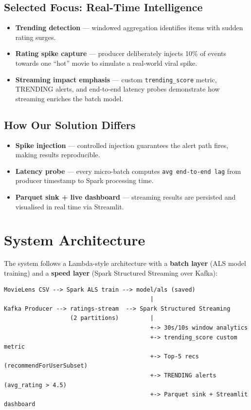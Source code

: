 \documentclass[12pt,a4paper]{article}
\begin{document}
\subsection{Selected Focus: Real-Time Intelligence}
\begin{itemize}
  \item \textbf{Trending detection} --- windowed aggregation identifies items with sudden rating surges.
  \item \textbf{Rating spike capture} --- producer deliberately injects 10\% of events towards one ``hot'' movie to simulate a real-world viral spike.
  \item \textbf{Streaming impact emphasis} --- custom \texttt{trending\_score} metric, TRENDING alerts, and end-to-end latency probes demonstrate how streaming enriches the batch model.
\end{itemize}

\subsection{How Our Solution Differs}
\begin{itemize}
  \item \textbf{Spike injection} --- controlled injection guarantees the alert path fires, making results reproducible.
  \item \textbf{Latency probe} --- every micro-batch computes \texttt{avg end-to-end lag} from producer timestamp to Spark processing time.
  \item \textbf{Parquet sink + live dashboard} --- streaming results are persisted and visualised in real time via Streamlit.
\end{itemize}

\section{System Architecture}

The system follows a Lambda-style architecture with a \textbf{batch layer} (ALS model training) and a \textbf{speed layer} (Spark Structured Streaming over Kafka):

\begin{lstlisting}
MovieLens CSV --> Spark ALS train --> model/als (saved)
                                          |
Kafka Producer --> ratings-stream  --> Spark Structured Streaming
                   (2 partitions)         |
                                          +-> 30s/10s window analytics
                                          +-> trending_score custom metric
                                          +-> Top-5 recs (recommendForUserSubset)
                                          +-> TRENDING alerts (avg_rating > 4.5)
                                          +-> Parquet sink + Streamlit dashboard
\end{lstlisting}
\end{document}
